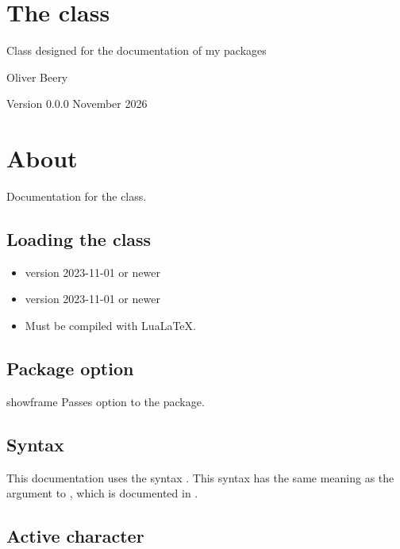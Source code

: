\documentclass{beerydoc}
\begin{document}
\section*{\LARGE The  class}

Class designed for the documentation of my packages

Oliver Beery

Version 0.0.0 November 2026


\section{About}
\label{sec:about}

Documentation for the  class.

\subsection{Loading the class}
\label{subsec:load}

\begin{itemize}
  \item \LaTeXe{} version 2023-11-01 or newer
  \item {} version 2023-11-01 or newer
  \item Must be compiled with Lua\LaTeX.
\end{itemize}

\subsection{Package option}
\label{subsec:pkgoptions}

\begin{codedoc}{showframe}
  Passes option  to the  package.
\end{codedoc}

\subsection{Syntax}
\label{subsec:syntax}

This documentation uses the syntax .
This syntax has the same meaning as the argument to , which is
documented in .

\subsection{Active character}
\label{subsec:activechar}
\end{document}
